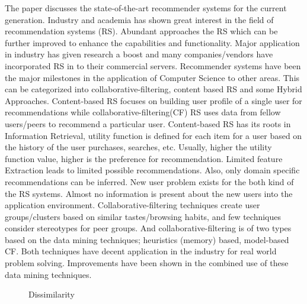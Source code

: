 The paper discusses the state-of-the-art recommender systems for the current generation. Industry and academia has shown great interest in the field of recommendation systems (RS). Abundant approaches the RS which can be further improved to enhance the capabilities and functionality. Major application in industry has given research a boost and many companies/vendors have incorporated RS in to their commercial servers. Recommender systems have been the major milestones in the application of Computer Science to other areas. This can be categorized into collaborative-filtering, content based RS and some Hybrid Approaches. Content-based RS focuses on building user profile of a single user for recommendations while collaborative-filtering(CF) RS uses data from fellow users/peers to recommend a particular user. Content-based RS has its roots in Information Retrieval, utility function is defined for each item for a user based on the history of the user purchases, searches, etc. Usually, higher the utility function value, higher is the preference for recommendation. Limited feature Extraction leads to limited possible recommendations. Also, only domain specific recommendations can be inferred. New user problem exists for the both kind of the RS systems. Almost no information is present about the new users into the application environment. Collaborative-filtering techniques create user groups/clusters based on similar tastes/browsing habits, and few techniques consider stereotypes for peer groups. And collaborative-filtering is of two types based on the data mining techniques; heuristics (memory) based, model-based CF. Both techniques have decent application in the industry for real world problem solving. Improvements have been shown in the combined use of these data mining techniques.

\begin{figure}[H]
    {\par}
    \caption{Dissimilarity}
\end{figure}

